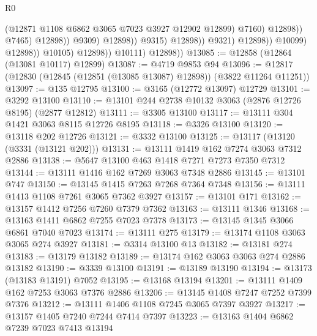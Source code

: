 \begin{lexlean}{R0}
\begin{coremodule}
                                                    (@12871
                                                      @1108
                                                      @6862
                                                      @3065
                                                      @7023
                                                      @3927
                                                      @12902
                                                      @12899)
                                                    @7160)
                                                  @12898))
                                              @7465)
                                            @12898))
                                        @9309)
                                      @12898))
                                  @9315)
                                @12898))
                            @9321)
                          @12898))
                      @10099)
                    @12898))
                @10105)
              @12898))
          @10111)
        @12898))
@13085 := @12858 (@12864 (@13081 @10117) @12899)
@13087 := @4719 @9853 @94
@13096 := @12817 (@12830 (@12845 (@12851 (@13085 @13087) @12898)) (@3822 @11264 @11251))
@13097 := @135 @12795
@13100 := @3165 (@12772 @13097) @12729
@13101 := @3292 @13100
@13110 := @13101 @244 @2738 @10132 @3063 (@2876 @12726 @8195) (@2877 @12812)
@13111 := @3305 @13100
@13117 := @13111 @304 @1421 @3063 @8115 @12726 @8195
@13118 := @3326 @13100
@13120 := @13118 @202 @12726
@13121 := @3332 @13100
@13125 := @13117 (@13120 (@3331 (@13121 @202)))
@13131 := @13111 @1419 @162 @7274 @3063 @7312 @2886
@13138 := @5647 @13100 @463 @1418 @7271 @7273 @7350 @7312
@13144 := @13111 @1416 @162 @7269 @3063 @7348 @2886
@13145 := @13101 @747
@13150 := @13145 @1415 @7263 @7268 @7364 @7348
@13156 := @13111 @1413 @1108 @7261 @3065 @7362 @3927
@13157 := @13101 @171
@13162 := @13157 @1412 @7256 @7260 @7379 @7362
@13163 := @13111 @1346
@13168 := @13163 @1411 @6862 @7255 @7023 @7378
@13173 := @13145 @1345 @3066 @6861 @7040 @7023
@13174 := @13111 @275
@13179 := @13174 @1108 @3063 @3065 @274 @3927
@13181 := @3314 @13100 @13
@13182 := @13181 @274
@13183 := @13179 @13182
@13189 := @13174 @162 @3063 @3063 @274 @2886 @13182
@13190 := @3339 @13100
@13191 := @13189 @13190
@13194 := @13173 (@13183 @13191) @7052
@13195 := @13168 @13194
@13201 := @13111 @1409 @162 @7253 @3063 @7376 @2886
@13206 := @13145 @1408 @7247 @7252 @7399 @7376
@13212 := @13111 @1406 @1108 @7245 @3065 @7397 @3927
@13217 := @13157 @1405 @7240 @7244 @7414 @7397
@13223 := @13163 @1404 @6862 @7239 @7023 @7413 @13194

\end{coremodule}
\end{lexlean}
